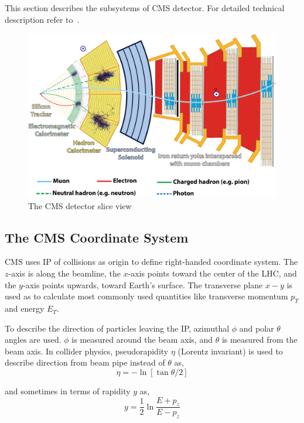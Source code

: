 This section describes the subsystems of \gls{CMS} detector.
For detailed technical description refer to~\cite{CMS-JINST-S08004}.

\begin{figure}[!ht]
  \centering
  \includegraphics[width=\textwidth]{figures/cms_slice.png}
  \caption[The CMS detector slice view]%
  {The CMS detector slice view~\cite{image-cms-slice}}%
  \label{fig:cms-slice}
\end{figure}

\subsection{
  The CMS Coordinate System
}\label{ch_cms:cms-coordinate}

CMS uses \gls{IP} of collisions as origin to define right-handed
coordinate system. The \( z \)-axis is along the beamline,
the \( x \)-axis points toward the center of the \gls{LHC},
and the \( y \)-axis points upwards, toward Earth's surface.
The transverse plane \( x - y \) is used as to calculate
most commonly used quantities like transverse momentum \( p_{T} \)
and energy \( E_{T} \).

To describe the direction of particles leaving the \gls{IP},
azimuthal \( \phi \) and polar \( \theta \) angles are used.
\( \phi \) is measured around the beam axis,
and \( \theta \) is measured from the beam axis.
In collider physics, pseudorapidity \( \eta \) (Lorentz invariant) is used
to describe direction from beam pipe instead of \( \theta \) as,
%
\begin{equation}
  \eta = - \ln[\tan{\theta/2}]
\end{equation}

and sometimes in terms of rapidity \( y \) as,
%
\begin{equation}
  y = \frac{1}{2} \ln{\frac{E+p_{z}}{E-p_{z}}}
\end{equation}

